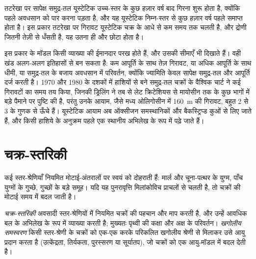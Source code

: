 \begin{omfigure}
\par{}\label{fig:b3:sequence-stratigraphy:section}
\end{omfigure}


तटरेखा पर सापेक्ष समुद्र-तल यूस्टेटिक उच्च-स्तर के कुछ हज़ार वर्ष बाद
गिरना शुरू होता है, क्योंकि पहले अवधसान को पार करना पड़ता है,
और यह यूस्टेटिक निम्न-स्तर से कुछ हज़ार वर्ष पहले समाप्त होता है। इस प्रकार तटरेखा पर
गिरावट यूस्टेटिक चक्र के आधे से कम समय तक चलती है, और द्रोणी जितनी
तेज़ी से धँसती है, यह उतना ही और छोटा होता है।

इस प्रकार के मॉडल किसी व्याख्या की ईमानदार परख होते हैं, और उसकी सीमाएँ
भी दिखाते हैं। वही खंड अलग-अलग इतिहासों से बन सकता है: कम आपूर्ति
के साथ तेज़ गिरावट, या अधिक आपूर्ति के साथ धीमी, या समुद्र-तल के
बजाय अवधसान में परिवर्तन, क्योंकि ज्यामिति केवल सापेक्ष समुद्र-तल और
आपूर्ति दर्ज करती है। 1970 और 1980 के दशकों में हाशियों से बने समुद्र-तल चक्रों के
वैश्विक चार्ट ने कई गिरावटों का समय तय किया, जिनकी ड्रिलिंग ने तब से
लेट क्रिटेशियस से मायोसीन तक के कुछ भागों में बड़े पैमाने पर पुष्टि की है, परंतु उनके
आयाम, जैसे मध्य ओलिगोसीन में \qty{160}{m} की गिरावट, बहुत
2 से 3 के गुणक से ऊँचे हैं। यूस्टेटिक आयाम अब
ऑक्सीजन समस्थानिकों और बैकस्ट्रिप्ड कुओं से लिए जाते हैं, और किसी
हाशिये के अनुक्रम पहले एक स्थानीय अभिलेख के रूप में पढ़े जाते हैं।

\section{चक्र-स्तरिकी}\label{sec:b3:sequence-stratigraphy:cyclo}

कई स्तर-श्रेणियाँ नियमित मोटाई-अंतरालों पर स्वयं को दोहराती हैं: मार्ल
और चूना-पत्थर के युग्म, पाँच युग्मों के गुच्छे, गुच्छों के बड़े समूह। यदि
यह पुनरावृत्ति मिलांकोविच प्राचलों से चलती है, तो चक्रों की मोटाई
समय में बदल जाती है।

\begin{definition}\label{def:b3:sequence-stratigraphy:cyclo}
\emph{चक्र-स्तरिकी} अवसादी स्तर-श्रेणियों में नियमित चक्रों
की पहचान और माप करती है, और उन्हें आवधिक बल के अभिलेख के रूप में
व्याख्या करती है; मुख्यतः पृथ्वी की कक्षा और अक्ष के परिवर्तन।
\emph{खगोलीय समस्वरण} किसी स्तर-श्रेणी के चक्रों को
एक-एक करके परिकलित खगोलीय श्रेणी से मिलाकर उसे आयु प्रदान करता है
(उत्केंद्रता, तिर्यकता, पुरस्सरण या सूर्यातप), जो चक्रों को एक
आयु-मॉडल में बदल देती है।
\end{definition}

